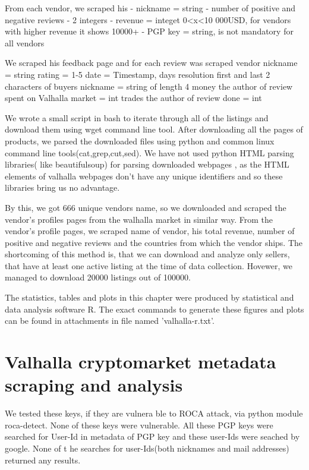 \documentclass[
  digital, %
  table,   %
  lof,     %
  lot,     %
  oneside
]{fithesis3}
\begin{document}
From each vendor, we scraped his
- nickname = string
- number of positive and negative reviews - 2 integers
- revenue = integet 0<x<10 000USD, for vendors with higher revenue it shows 10000+
- PGP key = string, is not mandatory for all vendors

We scraped his feedback page and for each review was scraped
vendor nickname = string
rating = 1-5
date = Timestamp, days resolution
first and last 2 characters of buyers nickname = string of length 4
money the author of review spent on Valhalla market = int
trades the author of review done = int

We wrote a small script in bash to iterate through all of the listings and download them using wget command line tool.
After downloading all the pages of products, we parsed the downloaded files using python and common linux command 
line tools(cat,grep,cut,sed). We have not used python HTML parsing libraries( like beautifulsoup) for parsing downloaded
webpages , as the HTML elements of valhalla webpages don't have any unique identifiers and so these libraries bring
 us no advantage.
 
By this, we got 666 unique vendors name, so we downloaded and scraped the vendor's profiles pages from the walhalla 
market in similar way.
From the vendor's profile pages, we scraped name of vendor, his total revenue, number of positive and negative reviews 
and the countries from which the vendor ships.
The shortcoming of this method is, that we can download and analyze only sellers, 
that have at least one active listing at the time of data collection. 
Hovewer, we managed to download 20000 listings out of 100000.

The statistics, tables and plots in this chapter were produced by statistical and data analysis software R.
The exact commands to generate these figures and plots can be found in attachments in file named 'valhalla-r.txt'.

\section{Valhalla cryptomarket metadata scraping and analysis}
We tested these keys, if they are vulnera
ble to ROCA attack, via python module roca-detect. None of these keys were vulnerable.
All these PGP keys were searched for User-Id in metadata of PGP key and these user-Ids were seached by google. None of t
he searches for user-Ids(both nicknames and mail addresses) returned any results.
\end{document}
